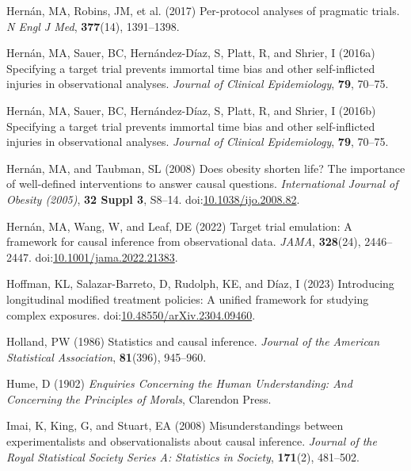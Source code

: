 \documentclass[
  single column]{article}
\newlength{\cslhangindent}
\newenvironment{CSLReferences}[2] %
 {\begin{list}{}{%
  \setlength{\itemindent}{0pt}
  \setlength{\leftmargin}{0pt}
  \setlength{\parsep}{0pt}
  \ifodd #1
   \setlength{\leftmargin}{\cslhangindent}
   \setlength{\itemindent}{-1\cslhangindent}
  \fi
  \setlength{\itemsep}{#2\baselineskip}}}
 {\end{list}}
\begin{document}
\begin{CSLReferences}{1}{0}
Hernán, MA, Robins, JM, et al. (2017) Per-protocol analyses of pragmatic
trials. \emph{N Engl J Med}, \textbf{377}(14), 1391--1398.

Hernán, MA, Sauer, BC, Hernández-Díaz, S, Platt, R, and Shrier, I
(2016a) Specifying a target trial prevents immortal time bias and other
self-inflicted injuries in observational analyses. \emph{Journal of
Clinical Epidemiology}, \textbf{79}, 70--75.

Hernán, MA, Sauer, BC, Hernández-Díaz, S, Platt, R, and Shrier, I
(2016b) Specifying a target trial prevents immortal time bias and other
self-inflicted injuries in observational analyses. \emph{Journal of
Clinical Epidemiology}, \textbf{79}, 70--75.

Hernán, MA, and Taubman, SL (2008) Does obesity shorten life? The
importance of well-defined interventions to answer causal questions.
\emph{International Journal of Obesity (2005)}, \textbf{32 Suppl 3},
S8--14.
doi:\href{https://doi.org/10.1038/ijo.2008.82}{10.1038/ijo.2008.82}.

Hernán, MA, Wang, W, and Leaf, DE (2022) Target trial emulation: A
framework for causal inference from observational data. \emph{JAMA},
\textbf{328}(24), 2446--2447.
doi:\href{https://doi.org/10.1001/jama.2022.21383}{10.1001/jama.2022.21383}.

Hoffman, KL, Salazar-Barreto, D, Rudolph, KE, and Díaz, I (2023)
Introducing longitudinal modified treatment policies: A unified
framework for studying complex exposures.
doi:\href{https://doi.org/10.48550/arXiv.2304.09460}{10.48550/arXiv.2304.09460}.

Holland, PW (1986) Statistics and causal inference. \emph{Journal of the
American Statistical Association}, \textbf{81}(396), 945--960.

Hume, D (1902) \emph{Enquiries Concerning the Human Understanding: And
Concerning the Principles of Morals}, Clarendon Press.

Imai, K, King, G, and Stuart, EA (2008) Misunderstandings between
experimentalists and observationalists about causal inference.
\emph{Journal of the Royal Statistical Society Series A: Statistics in
Society}, \textbf{171}(2), 481--502.


\end{CSLReferences}
\end{document}
